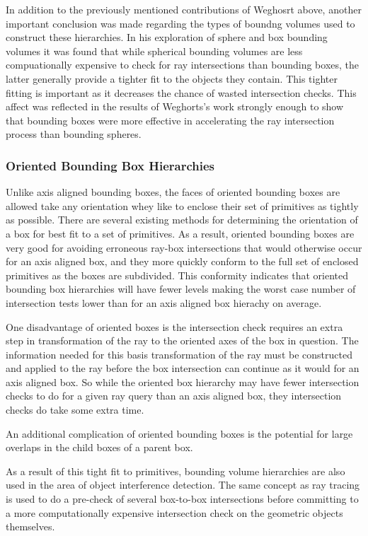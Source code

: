 \documentclass[10pt, a4paper]{article}
\begin{document}
In addition to the previously mentioned contributions of Weghosrt above, another important conclusion was made regarding the types of boundng volumes used to construct these hierarchies. In his exploration of sphere and box bounding volumes it was found that while spherical bounding volumes are less compuationally expensive to check for ray intersections than bounding boxes, the latter generally provide a tighter fit to the objects they contain. This tighter fitting is important as it decreases the chance of wasted intersection checks. This affect was reflected in the results of Weghorts's work strongly enough to show that bounding boxes were more effective in accelerating the ray intersection process than bounding spheres. 


\subsubsection{Oriented Bounding Box Hierarchies}%

Unlike axis aligned bounding boxes, the faces of oriented bounding boxes are allowed take any orientation whey like to enclose their set of primitives as tightly as possible. There are several existing methods for determining the orientation of a box for best fit to a set of primitives.\cite{gottschalk1996obbtree} As a result, oriented bounding boxes are very good for avoiding erroneous ray-box intersections that would otherwise occur for an axis aligned box, and they more quickly conform to the full set of enclosed primitives as the boxes are subdivided. This conformity indicates that oriented bounding box hierarchies will have fewer levels making the worst case number of intersection tests lower than for an axis aligned box hierachy on average.

One disadvantage of oriented boxes is the intersection check requires an extra step in transformation of the ray to the oriented axes of the box in question. The information needed for this basis transformation of the ray must be constructed and applied to the ray before the box intersection can continue as it would for an axis aligned box. So while the oriented box hierarchy may have fewer intersection checks to do for a given ray query than an axis aligned box, they intersection checks do take some extra time.

An additional complication of oriented bounding boxes is the potential for large overlaps in the child boxes of a parent box. 

As a result of this tight fit to primitives, bounding volume hierarchies are also used in the area of object interference detection. The same concept as ray tracing is used to do a pre-check of several box-to-box intersections before committing to a more computationally expensive intersection check on the geometric objects themselves.
\end{document}

